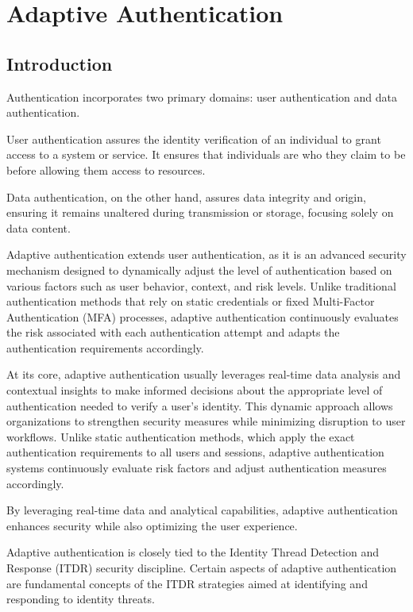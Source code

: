 \chapter{Adaptive Authentication}
\section{Introduction}

Authentication incorporates two primary domains: user authentication and data authentication. 

User authentication assures the identity verification of an individual to grant access to a system or service.
It ensures that individuals are who they claim to be before allowing them access to resources.

Data authentication, on the other hand, assures data integrity and origin, ensuring it remains unaltered during transmission or storage, focusing solely on data content.

Adaptive authentication extends user authentication, as it is an advanced security mechanism designed to dynamically adjust the level of authentication based on various factors such as user behavior, context, and risk levels.
Unlike traditional authentication methods that rely on static credentials or fixed Multi-Factor Authentication (MFA) processes, adaptive authentication continuously evaluates the risk associated with each authentication attempt and adapts the authentication requirements accordingly.

At its core, adaptive authentication usually leverages real-time data analysis and contextual insights to make informed decisions about the appropriate level of authentication needed to verify a user's identity.
This dynamic approach allows organizations to strengthen security measures while minimizing disruption to user workflows.
Unlike static authentication methods, which apply the exact authentication requirements to all users and sessions, adaptive authentication systems continuously evaluate risk factors and adjust authentication measures accordingly.

By leveraging real-time data and analytical capabilities, adaptive authentication enhances security while also optimizing the user experience.\cite{intro-logintc}

Adaptive authentication is closely tied to the Identity Thread Detection and Response (ITDR) security discipline.
Certain aspects of adaptive authentication are fundamental concepts of the ITDR strategies aimed at identifying and responding to identity threats.
\newpage

